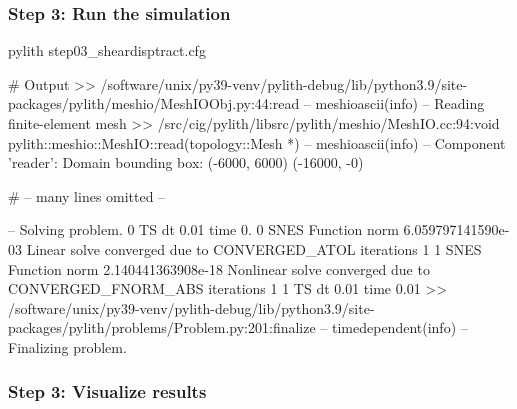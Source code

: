 \documentclass[aspectratio=169]{beamer}
\begin{document}
\begin{frame}[fragile]
  \frametitle{Step 3: Run the simulation}
  \summary{}

\begin{bashcode}
pylith step03_sheardisptract.cfg

# Output
 >> /software/unix/py39-venv/pylith-debug/lib/python3.9/site-packages/pylith/meshio/MeshIOObj.py:44:read
 -- meshioascii(info)
 -- Reading finite-element mesh
 >> /src/cig/pylith/libsrc/pylith/meshio/MeshIO.cc:94:void pylith::meshio::MeshIO::read(topology::Mesh *)
 -- meshioascii(info)
 -- Component 'reader': Domain bounding box:
    (-6000, 6000)
    (-16000, -0)

# -- many lines omitted --

 -- Solving problem.
0 TS dt 0.01 time 0.
    0 SNES Function norm 6.059797141590e-03 
    Linear solve converged due to CONVERGED_ATOL iterations 1
    1 SNES Function norm 2.140441363908e-18 
  Nonlinear solve converged due to CONVERGED_FNORM_ABS iterations 1
1 TS dt 0.01 time 0.01
 >> /software/unix/py39-venv/pylith-debug/lib/python3.9/site-packages/pylith/problems/Problem.py:201:finalize
 -- timedependent(info)
 -- Finalizing problem.
\end{bashcode}
  
\end{frame}


\begin{frame}
  \frametitle{Step 3: Visualize results}

    
\end{frame}


\end{document}

